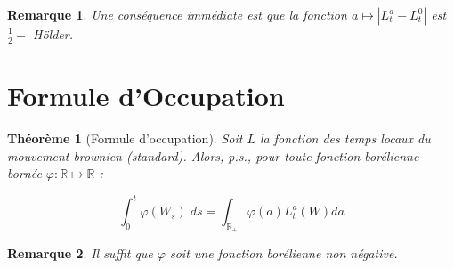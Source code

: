 \documentclass[openany]{book}
\newcommand{\R}{\mathbb{R}}
\newcommand{\1}{\mathbbm{1}}
\theoremstyle{thmfont}
\newtheorem{theorem}{Théorème}[chapter]
\theoremstyle{deffont}
\theoremstyle{thmfont}
\theoremstyle{deffont}
\newtheorem*{remark}{Remarque}
\begin{document}
\begin{remark}
  Une conséquence immédiate est que la fonction $a \mapsto |L_t^a - L_t^0|$ est $\frac{1}{2}-$ Hölder. 
\end{remark}

\section{Formule d'Occupation}

\begin{theorem}[Formule d'occupation]
\label{thm:occupation} Soit $L$ la fonction des temps locaux du mouvement brownien (standard). Alors, p.s., pour toute fonction borélienne bornée $\varphi : \R \mapsto \R$ :

\begin{equation}
  \int_0^t \varphi(W_s) \; ds = \int_{\R_+}\varphi(a)L_t^a(W)da
  \label{eq:occupation}
\end{equation}

\end{theorem}

\begin{remark}
  Il suffit que $\varphi$ soit une fonction borélienne non négative.
  \end{remark}
\end{document}
